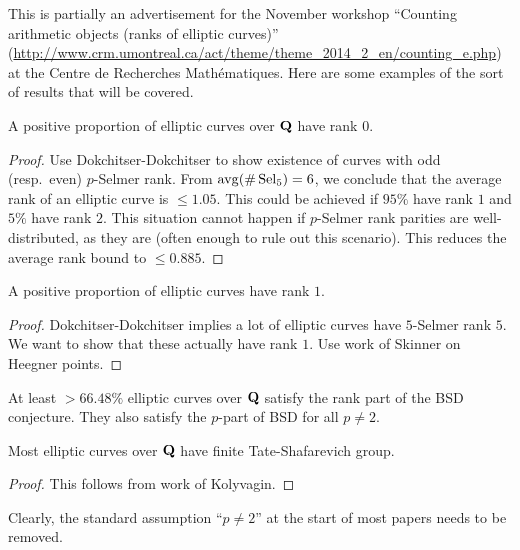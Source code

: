 This is partially an advertisement for the November workshop ``Counting 
arithmetic objects (ranks of elliptic curves)'' 
(\url{http://www.crm.umontreal.ca/act/theme/theme_2014_2_en/counting_e.php}) at 
the Centre de Recherches Math\'ematiques. 
Here are some examples of the sort of results that will be covered. 

\begin{theo}
A positive proportion of elliptic curves over $\mathbf{Q}$ have rank $0$. 
\end{theo}
\begin{proof}
Use Dokchitser-Dokchitser to show existence of curves with odd (resp.~even) 
$p$-Selmer rank. From $\operatorname{avg}(\#\operatorname{Sel}_5)=6$, we conclude that the average 
rank of an elliptic curve is $\leqslant 1.05$. This could be achieved if 
$95\%$ have rank $1$ and $5\%$ have rank $2$. This situation cannot happen if 
$p$-Selmer rank parities are well-distributed, as they are (often enough to 
rule out this scenario). This reduces the average rank bound to 
$\leqslant 0.885$. 
\end{proof}

\begin{theo}
A positive proportion of elliptic curves have rank $1$. 
\end{theo}
\begin{proof}
Dokchitser-Dokchitser implies a lot of elliptic curves have $5$-Selmer rank 
$5$. We want to show that these actually have rank $1$. Use work of Skinner 
\cite{s14} on Heegner points. 
\end{proof}

\begin{theo}
At least $>66.48\%$ elliptic curves over $\mathbf{Q}$ satisfy the rank part of the BSD 
conjecture. They also satisfy the $p$-part of BSD for all $p\ne 2$. 
\end{theo}

\begin{coro}
Most elliptic curves over $\mathbf{Q}$ have finite Tate-Shafarevich group. 
\end{coro}
\begin{proof}
This follows from work of Kolyvagin. 
\end{proof}

Clearly, the standard assumption ``$p\ne 2$'' at the start of most papers 
needs to be removed. 




